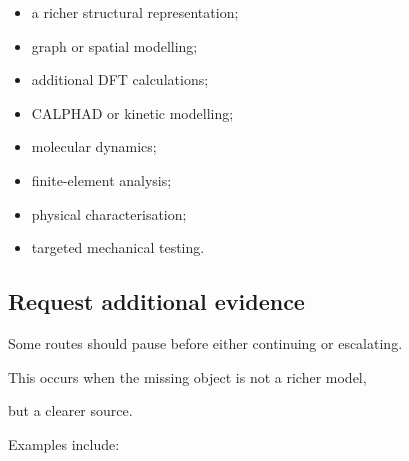 \documentclass[11pt,a4paper,oneside]{report}
\begin{document}
\begin{itemize}



\item

a richer structural representation;



\item

graph or spatial modelling;



\item

additional DFT calculations;



\item

CALPHAD or kinetic modelling;



\item

molecular dynamics;



\item

finite-element analysis;



\item

physical characterisation;



\item

targeted mechanical testing.



\end{itemize}





\subsection{Request additional evidence}



Some routes should pause before either continuing or escalating.



This occurs when the missing object is not a richer model,

but a clearer source.



Examples include:
\end{document}
